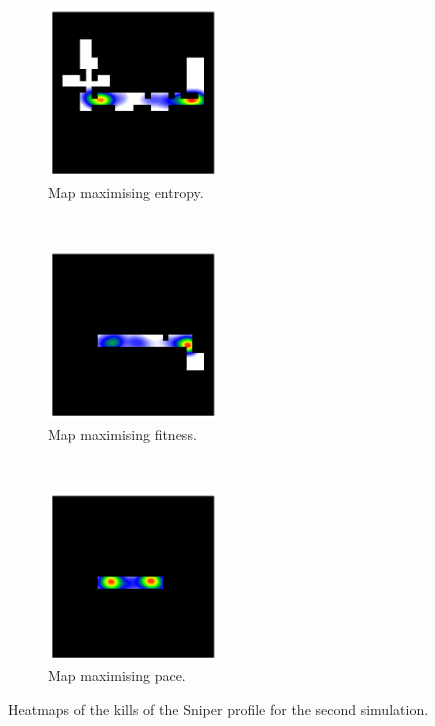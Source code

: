 \begin{figure}[H]
    \centering
    \begin{subfigure}[t]{0.3\textwidth}
        \centering
        \includegraphics[height=4.5cm]{Images/images/experiment_one/best_entropy_pop_1/kills_bot_1.png}
        \caption{Map maximising entropy.}
    \end{subfigure}%
    ~ 
    \begin{subfigure}[t]{0.3\textwidth}
        \centering
        \includegraphics[height=4.5cm]{Images/images/experiment_one/best_fitness_pop_1/kills_bot_1.png}
        \caption{Map maximising fitness.}
    \end{subfigure}
    ~ 
    \begin{subfigure}[t]{0.3\textwidth}
        \centering
        \includegraphics[height=4.5cm]{Images/images/experiment_one/best_pace_pop_1/kills_bot_1.png}
        \caption{Map maximising pace.}
    \end{subfigure}
    \caption{Heatmaps of the kills of the Sniper profile for the second simulation.}
\end{figure}
